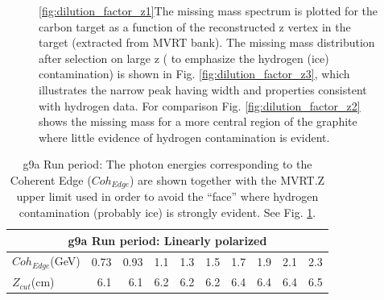 \begin{figure}[H]
  \begin{center}
    \qquad
    \qquad

    \caption{\ref{fig:dilution_factor_z1}The missing mass spectrum is plotted for the carbon target as a function of the reconstructed z vertex in the target (extracted from MVRT bank). The missing mass distribution after selection on large z ( to emphasize the hydrogen (ice) contamination) is shown in Fig. \ref{fig:dilution_factor_z3}, which illustrates the narrow peak having width and properties consistent with hydrogen data. For comparison Fig.  \ref{fig:dilution_factor_z2}  shows the missing mass for a more central region of the graphite where little evidence of hydrogen contamination is evident.}
    \label{fig:dilution_factor_z0}
  \end{center}
\end{figure}

\begin{table}
  \begin{center}
    \begin{tabular}{ ||l|r|r|r|r|r|r|r|r|r||}
      \hline
      \multicolumn{10}{|c|}{g9a Run period: Linearly polarized } \\
      \hline
      $Coh_{Edge}$(GeV)&0.73&0.93&1.1&1.3&1.5&1.7&1.9&2.1&2.3 \\
      \hline
      $Z_{cut}$(cm)&6.1&6.1&6.2&6.2&6.2&6.4&6.4&6.4&6.5 \\
      \hline
    \end{tabular}
  \end{center}
  \caption{g9a Run period: The photon energies corresponding to the Coherent Edge ($Coh_{Edge}$) are shown together with the MVRT.Z upper limit used in order to avoid the ``face'' where hydrogen contamination (probably ice) is strongly evident. See Fig. \ref{fig:dilution_factor_z0}.}
  \label{table:dil_factor_zcut}
\end{table}

